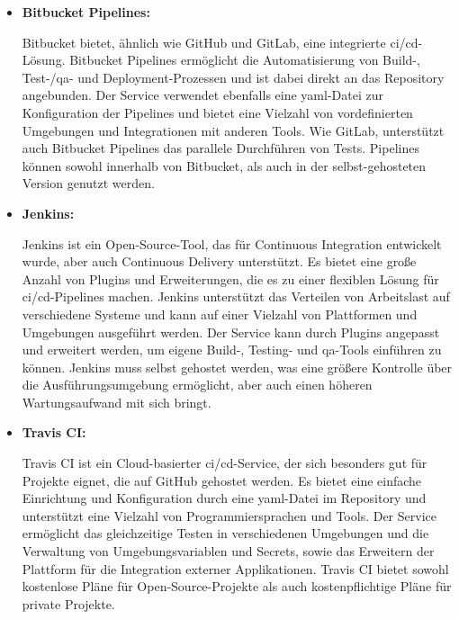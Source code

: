 \begin{itemize}
    \item{
        \textbf{Bitbucket Pipelines:}\par
        Bitbucket bietet, ähnlich wie GitHub und GitLab, eine integrierte \acrshort{ci}/\acrshort{cd}-Lösung.
        Bitbucket Pipelines ermöglicht die Automatisierung von Build-, Test-/\acrshort{qa}- und Deployment-Prozessen und
        ist dabei direkt an das Repository angebunden.
        Der Service verwendet ebenfalls eine \acrshort{yaml}-Datei zur Konfiguration der Pipelines und bietet eine
        Vielzahl von vordefinierten Umgebungen und Integrationen mit anderen Tools.
        Wie GitLab, unterstützt auch Bitbucket Pipelines das parallele Durchführen von Tests.
        Pipelines können sowohl innerhalb von Bitbucket, als auch in der selbst-gehosteten Version genutzt werden.
    }

    \item{
        \textbf{Jenkins:}\par
        Jenkins ist ein Open-Source-Tool, das für Continuous Integration entwickelt wurde, aber auch Continuous Delivery
        unterstützt.
        Es bietet eine große Anzahl von Plugins und Erweiterungen, die es zu einer flexiblen Lösung für
        \acrshort{ci}/\acrshort{cd}-Pipelines machen.
        Jenkins unterstützt das Verteilen von Arbeitslast auf verschiedene Systeme und kann auf einer Vielzahl von
        Plattformen und Umgebungen ausgeführt werden.
        Der Service kann durch Plugins angepasst und erweitert werden, um eigene Build-, Testing- und
        \acrshort{qa}-Tools einführen zu können.
        Jenkins muss selbst gehostet werden, was eine größere Kontrolle über die Ausführungsumgebung ermöglicht, aber
        auch einen höheren Wartungsaufwand mit sich bringt.
    }

    \item{
        \textbf{Travis CI:}\par
        Travis CI ist ein Cloud-basierter \acrshort{ci}/\acrshort{cd}-Service, der sich besonders gut für Projekte
        eignet, die auf GitHub gehostet werden.
        Es bietet eine einfache Einrichtung und Konfiguration durch eine \acrshort{yaml}-Datei im Repository und
        unterstützt eine Vielzahl von Programmiersprachen und Tools.
        Der Service ermöglicht das gleichzeitige Testen in verschiedenen Umgebungen und die Verwaltung von
        Umgebungsvariablen und Secrets, sowie das Erweitern der Plattform für die Integration externer Applikationen.
        Travis CI bietet sowohl kostenlose Pläne für Open-Source-Projekte als auch kostenpflichtige Pläne für private
        Projekte.
    }
\end{itemize}

